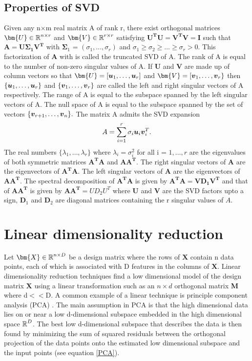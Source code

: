 \newpage
\subsection{Properties of SVD}
Given any n$\times$m real matrix A of rank r, there exist  orthogonal matrices 
$\bm{U} \in \R^{n \times r}$ and $\bm{V} \in \R^{r \times r}$ 
satisfying $\bm{U^{T}U = V^{T}V = I}$ such that $\bm{\text{A} = \text{U} \Sigma_{1} \text{V}^{T}}$ with $\bm{\Sigma}_{1}$ = $(\sigma_{1}, \ldots, \sigma_{r})$ and $\sigma_{1} \geq \sigma_{2} \geq \ldots \geq \sigma_{r} > 0$.
This factorization of $\bm{A}$ with  is called the truncated SVD of A.
The rank of A is equal to the number of non-zero singular values of A.
If $\bm{U}$ and $\bm{V}$ are made up of column vectors so that  $\bm{U} = [\vect{u}_1, \ldots, \vect{u}_{r}]$ and $\bm{V} = [\vect{v}_{1}, \ldots, \vect{v}_{r}\}$ then $\{ \boldsymbol{u}_1, \ldots, \boldsymbol{u}_{r} \}$  and $\{\boldsymbol{v}_{1}, \ldots, \boldsymbol{v}_{r} \}$ are called the left and right singular vectors of A respectively. The range of A is equal to the subspace spanned by the left singular vectors of A. The null space of A is equal to the subspace spanned by the set of vectors $\{\boldsymbol{v}_{r+1}, \ldots, \boldsymbol{v}_{n} \}.$
The matrix A admits the SVD expansion 
\[
A = \sum_{i=1}^{r} \sigma_{i} \boldsymbol{u}_{i} \boldsymbol{v}_{i}^{T}.
\]
The real numbers $\{\lambda_{1}, \ldots, \lambda_{r}\}$ where $\lambda_{i} = \sigma_{i}^{2}$ for all i = $1 , \ldots, r$ are the eigenvalues of both symmetric matrices $\bm{A^{T}A}$ and $\bm{AA^{T}}.$ The right singular vectors of $\bm{A}$ are the eigenvectors of $\bm{A^{T}A}.$ The left singular vectors of $\bm{A}$ are the eigenvectors of $\bm{AA^{T}}.$ The spectral decomposition of $\bm{A^{T}A}$ is given by $\bm{A^{T}A  = V D_{1} V^{T}}$ and that of  $\bm{AA^{T}}$ is given by  $\bm{AA^{T}} = U D_{2} U^{T}$ where $\bm{U}$ and $\bm{V}$ are the SVD factors upto a sign, $\bm{D}_{1}$ and $\bm{D}_{2}$ are diagonal matrices containing the r singular values of $A$.

\section{Linear dimensionality  reduction}
Let $\bm{X} \in \R^{n \times D}$ be a design matrix where the rows of
$\bm{X}$ contain n data points, each of which is associated with D features
in the columns of $\bm{X}$.
Linear dimensionality reduction techniques find a low dimensional model of the design matrix $\textbf{X}$ using a linear transformation such as an $n \times d$ orthogonal matrix \textbf{M} where d$<<$D. A common example of a linear technique is principle component analysis (PCA) \cite{JolliffeIT1986PCAa}.
The main assumption in PCA is that the high dimensional data lies on or near a low d-dimensional subspace embedded in the high dimensional space $\operatorname{\mathbb{R}}^{D}$. The best low d-dimensional subspace that describes the data is then found by minimizing the sum of squared residuals between the orthogonal projection of the data  points onto the estimated low dimensional subspace and the input points (see equation \eqref{PCA}).



